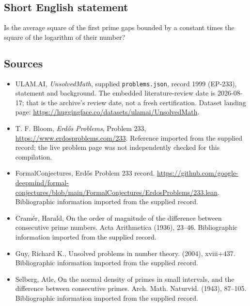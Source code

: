 \documentclass[11pt,a4paper]{article}
\begin{document}
\subsection{Short English statement}

Is the average square of the first prime gaps bounded by a constant times the square of the logarithm of their number?

\subsection{Sources}

{\small

\begin{itemize}

\item[\hypertarget{source:1999:1}{S1}] ULAM.AI, \emph{UnsolvedMath}, supplied \texttt{problems.json}, record 1999 (EP-233), statement and background. The embedded literature-review date is 2026-08-17; that is the archive’s review date, not a fresh certification. Dataset landing page: \url{https://huggingface.co/datasets/ulamai/UnsolvedMath}.

\item[\hypertarget{source:1999:2}{S2}] T. F. Bloom, \emph{Erdős Problems}, Problem 233, \url{https://www.erdosproblems.com/233}. Reference imported from the supplied record; the live problem page was not independently checked for this compilation.

\item[\hypertarget{source:1999:3}{S3}] FormalConjectures, Erdős Problem 233 record. \url{https://github.com/google-deepmind/formal-conjectures/blob/main/FormalConjectures/ErdosProblems/233.lean}. Bibliographic information imported from the supplied record.

\item[\hypertarget{source:1999:4}{S4}] Cram\'{e}r, Harald, On the order of magnitude of the difference between consecutive prime numbers. Acta Arithmetica (1936), 23--46. Bibliographic information imported from the supplied record.

\item[\hypertarget{source:1999:5}{S5}] Guy, Richard K., Unsolved problems in number theory. (2004), xviii+437. Bibliographic information imported from the supplied record.

\item[\hypertarget{source:1999:6}{S6}] Selberg, Atle, On the normal density of primes in small intervals, and the difference between consecutive primes. Arch. Math. Naturvid. (1943), 87--105. Bibliographic information imported from the supplied record.

\end{itemize}

}

\label{end:1999}
\end{document}
